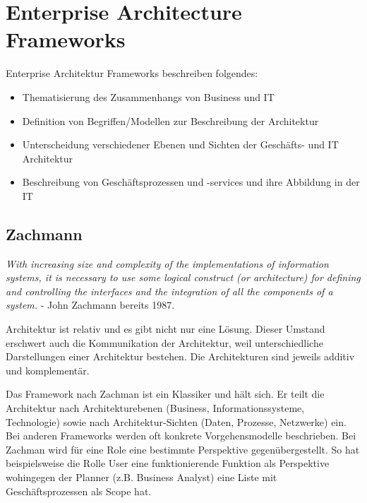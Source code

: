 \section{Enterprise Architecture Frameworks}

Enterprise Architektur Frameworks beschreiben folgendes:
\begin{itemize}
	\item Thematisierung des Zusammenhangs von Business und IT
	
	\item Definition von Begriffen/Modellen zur Beschreibung der Architektur
	
	\item Unterscheidung verschiedener Ebenen und Sichten der Geschäfts- und IT Architektur
	
	\item Beschreibung von Geschäftsprozessen und -services und ihre Abbildung in der IT
\end{itemize}

\subsection{Zachmann}

\textit{With increasing size and complexity of the implementations of information systems, it is necessary to use some logical construct (or architecture) for defining and controlling the interfaces and the integration of all the components of a system.} - John Zachmann bereits 1987.

Architektur ist relativ und es gibt nicht nur eine Lösung. Dieser Umstand erschwert auch die Kommunikation der Architektur, weil unterschiedliche Darstellungen einer Architektur bestehen. Die Architekturen sind jeweils additiv und komplementär.

Das Framework nach Zachman ist ein Klassiker und hält sich. Er teilt die Architektur nach Architekturebenen (Business, Informationssysteme, Technologie) sowie nach Architektur-Sichten (Daten, Prozesse, Netzwerke) ein. Bei anderen Frameworks werden oft konkrete Vorgehensmodelle beschrieben. Bei Zachman wird für eine Role eine bestimmte Perspektive gegenübergestellt. So hat beispielsweise die Rolle User eine funktionierende Funktion als Perspektive wohingegen der Planner (z.B. Business Analyst) eine Liste mit Geschäftsprozessen als Scope hat.

